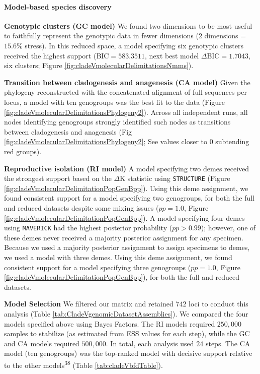\documentclass[
  11pt,
]{article}
\begin{document}
\hypertarget{model-based-species-discovery-9}{%
\paragraph{Model-based species discovery}\label{model-based-species-discovery-9}}

\textbf{Genotypic clusters (GC model)} We found two dimensions to be most useful to faithfully represent the genotypic data in fewer dimensions (2 dimensions = \(15.6\%\) stress). In this reduced space, a model specifying six genotypic clusters received the highest support (BIC\(=583.3511\), next best model \(\Delta\)BIC\(=1.7043\), six clusters; Figure \ref{fig:cladeVmolecularDelimitationsNmms}).

\textbf{Transition between cladogenesis and anagenesis (CA model)} Given the phylogeny reconstructed with the concatenated alignment of full sequences per locus, a model with ten genogroups was the best fit to the data (Figure \ref{fig:cladeVmolecularDelimitationsPhylogeny2}). Across all independent runs, all nodes identifying genogroups strongly identified such nodes as transitions between cladogenesis and anagenesis (Fig \ref{fig:cladeVmolecularDelimitationsPhylogeny2}; See values closer to \(0\) subtending red groups).

\textbf{Reproductive isolation (RI model)} A model specifying two demes received the strongest support based on the \(\Delta\)K statistic using \texttt{STRUCTURE} (Figure \ref{fig:cladeVmolecularDelimitationPopGenBpp}). Using this deme assignment, we found consistent support for a model specifying two genogroups, for both the full and reduced datasets despite some mixing issues (\(pp=1.0\), Figure \ref{fig:cladeVmolecularDelimitationPopGenBpp}). A model specifying four demes using \texttt{MAVERICK} had the highest posterior probability (\(pp>0.99\)); however, one of these demes never received a majority posterior assignment for any specimen. Because we used a majority posterior assignment to assign specimens to demes, we used a model with three demes. Using this deme assignment, we found consistent support for a model specifying three genogroups (\(pp=1.0\), Figure \ref{fig:cladeVmolecularDelimitationPopGenBpp}), for both the full and reduced datasets.

\textbf{Model Selection} We filtered our matrix and retained \(742\) loci to conduct this analysis (Table \ref{tab:CladeVgenomicDatasetAssemblies}). We compared the four models specified above using Bayes Factors. The RI models required \(250,000\) samples to stabilize (as estimated from ESS values for each step), while the GC and CA models required \(500,000\). In total, each analysis used \(24\) steps. The CA model (ten genogroups) was the top-ranked model with decisive support relative to the other models\textsuperscript{38} (Table \ref{tab:cladeVbfdTable}).
\end{document}
